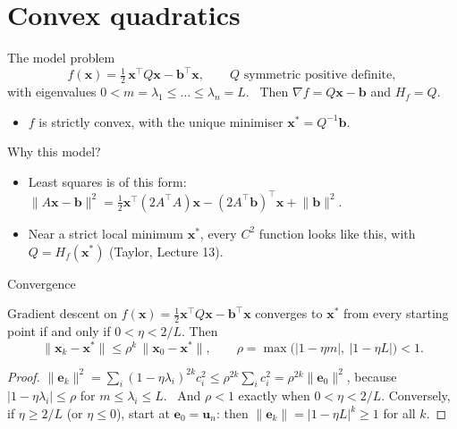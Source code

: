 \documentclass[10pt]{wosm-slides}
\newcommand{\norm}[1]{\lVert #1 \rVert}
\newcommand{\vx}{\mathbf{x}}
\newcommand{\vb}{\mathbf{b}}
\newcommand{\ve}{\mathbf{e}}
\newcommand{\vu}{\mathbf{u}}
\begin{document}
\section{Convex quadratics}

\begin{frame}{The model problem}
  \[ f(\vx) = \tfrac12\, \vx^\top Q \vx - \vb^\top \vx, \qquad Q \text{ symmetric positive definite}, \]
  with eigenvalues $0 < m = \lambda_1 \le \dots \le \lambda_n = L$. \ Then
  $\nabla f = Q\vx - \vb$ and $H_f = Q$.
  \begin{itemize}
    \item $f$ is strictly convex, with the unique minimiser $\vx^* = Q^{-1}\vb$.
  \end{itemize}
  \pause
  Why this model?
  \begin{itemize}
    \item Least squares is of this form: $\norm{A\vx - \vb}^2 = \frac12 \vx^\top (2A^\top A)\vx
      - (2A^\top\vb)^\top\vx + \norm{\vb}^2$.
    \item Near a strict local minimum $\vx^*$, every $C^2$ function looks like this, with
      $Q = H_f(\vx^*)$ (Taylor, Lecture 13).
  \end{itemize}
\end{frame}


\begin{frame}{Convergence}
  \begin{theorem}
    Gradient descent on $f(\vx) = \frac12 \vx^\top Q\vx - \vb^\top\vx$ converges to $\vx^*$ from every
    starting point if and only if $0 < \eta < 2/L$. Then
    \[ \norm{\vx_k - \vx^*} \le \rho^k\, \norm{\vx_0 - \vx^*}, \qquad
       \rho = \max\bigl(|1 - \eta m|, \ |1 - \eta L|\bigr) < 1 . \]
  \end{theorem}
  \pause
  \begin{proof}
    $\norm{\ve_k}^2 = \sum_i (1 - \eta\lambda_i)^{2k} c_i^2 \le \rho^{2k} \sum_i c_i^2 = \rho^{2k}\norm{\ve_0}^2$,
    because $|1 - \eta\lambda_i| \le \rho$ for $m \le \lambda_i \le L$. \ And $\rho < 1$ exactly when
    $0 < \eta < 2/L$.
    \pause
    Conversely, if $\eta \ge 2/L$ (or $\eta \le 0$), start at $\ve_0 = \vu_n$: then
    $\norm{\ve_k} = |1 - \eta L|^k \ge 1$ for all $k$.
  \end{proof}
\end{frame}
\end{document}

